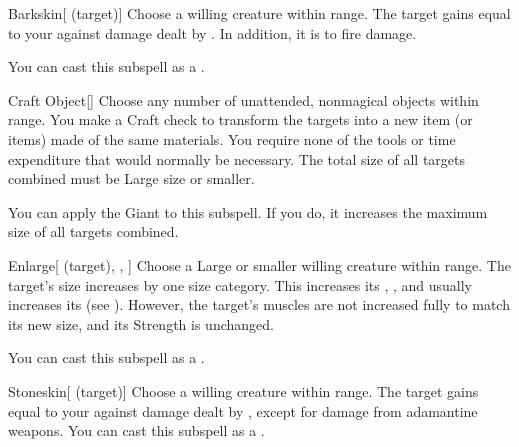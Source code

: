 \begin{ability}[\nth{2}]{Barkskin}[ (target)]
Choose a willing creature within \rngclose range.
The target gains  equal to your  against damage dealt by .
In addition, it is  to fire damage.

You can cast this subspell as a .
\end{ability}
\vspace{0.25em}



\begin{ability}[\nth{3}]{Craft Object}[]
Choose any number of unattended, nonmagical objects within \rngclose range.
You make a Craft check to transform the targets into a new item (or items) made of the same materials.
You require none of the tools or time expenditure that would normally be necessary.
The total size of all targets combined must be Large size or smaller.

You can apply the Giant  to this subspell.
If you do, it increases the maximum size of all targets combined.
\end{ability}
\vspace{0.25em}



\begin{ability}[\nth{3}]{Enlarge}[ (target), , ]
Choose a Large or smaller willing creature within \rngclose range.
The target's size increases by one size category.
This increases its , , and usually increases its  (see ).
However, the target's muscles are not increased fully to match its new size, and its Strength is unchanged.

You can cast this subspell as a .
\end{ability}
\vspace{0.25em}



\begin{ability}[\nth{3}]{Stoneskin}[ (target)]
Choose a willing creature within \rngclose range.
The target gains  equal to your  against damage dealt by , except for damage from adamantine weapons.
You can cast this subspell as a .
\end{ability}
\vspace{0.25em}



